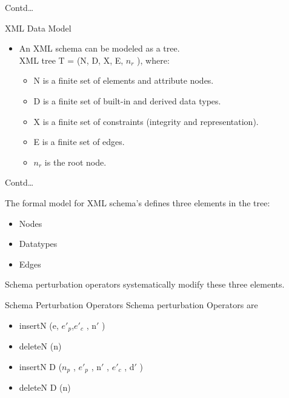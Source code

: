 \documentclass[10pt]{beamer}
\begin{document}
\begin{frame}{Contd\dots}
\begin{block}{XML Data Model}
\begin{itemize}
\item An XML schema can be modeled as a tree.\\
XML tree T = (N, D, X, E, $n_r$ ), where:
\begin{itemize}
\item N is a finite set of elements and attribute nodes.
\item D is a finite set of built-in and derived data types.
\item X is a finite set of constraints (integrity and representation).
\item E is a finite set of edges.

\item   $n_r$ is the root node.
\end{itemize}
 
\end{itemize}
\end{block}
\end{frame}

\begin{frame}{Contd\dots}
	\begin{block}{}


The formal model for XML schema's defines three elements in the tree: \\
\begin{itemize}
\item Nodes
\item Datatypes
\item Edges
\end{itemize}
Schema perturbation operators systematically modify these three elements.
	\end{block}
\begin{block}{Schema Perturbation Operators}
Schema perturbation Operators are
\begin{itemize}
\item insertN (e, $e\ensuremath{'}_ p$,$e\ensuremath{'}_c$ , n\ensuremath{'} )
\item deleteN (n)
\item insertN D ($n_p$ , $e\ensuremath{'}_p$ , n\ensuremath{'} , $e\ensuremath{'}_c$ , d\ensuremath{'} )
\item deleteN D (n)
\end{itemize}
\end{block}
\end{frame}
\end{document}
